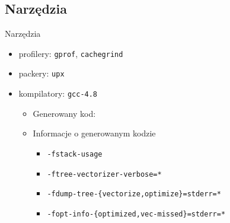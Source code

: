 \subsection{Narzędzia}
\begin{frame}[fragile]{Narzędzia}
	\begin{itemize}
		\item profilery: \texttt{gprof}, \texttt{cachegrind}
		\item packery: \texttt{upx}
		\item kompilatory: \texttt{gcc-4.8}
		\begin{itemize}
			\item Generowany kod:
			\item Informacje o generowanym kodzie
			\begin{itemize}
				\item \texttt{-fstack-usage}
				\item \texttt{-ftree-vectorizer-verbose=*}
				\item \texttt{-fdump-tree-\{vectorize,optimize\}=stderr=*}
				\item \texttt{-fopt-info-\{optimized,vec-missed\}=stderr=*}
			\end{itemize}
		\end{itemize}
	\end{itemize}
\end{frame}
